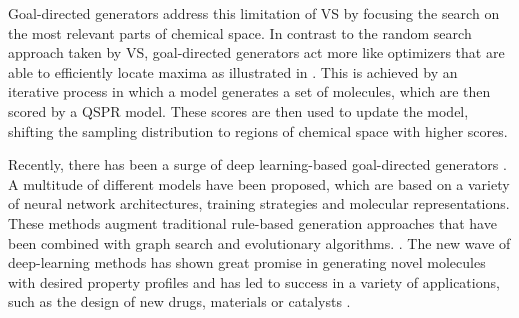 Goal-directed generators address this limitation of \ac{VS} by focusing the search on the most
relevant parts of chemical space. In contrast to the random search approach taken by \ac{VS},
goal-directed generators act more like optimizers that are able to efficiently locate maxima as
illustrated in . This is achieved by an iterative process in
which a model generates a set of molecules, which are then scored by a \ac{QSPR} model. These scores
are then used to update the model, shifting the sampling distribution to regions of chemical space
with higher scores.

Recently, there has been a surge of deep learning-based goal-directed generators
\citep{eltonDeepLearningMolecular2019,sanchez-lengelingInverseMolecularDesign2018,duMachineLearningaidedGenerative2024}.
A multitude of different models have been proposed, which are based on a variety of neural network
architectures, training strategies and molecular representations. These methods augment traditional
rule-based generation approaches that have been combined with graph search and evolutionary
algorithms. \citep{schneiderComputerbasedNovoDesign2005,schneiderNovoMolecularDesign2013}. The new
wave of deep-learning methods has shown great promise in generating novel molecules with desired
property profiles and has led to success in a variety of applications, such as the design of new drugs,
materials or catalysts \citep{todo}.

